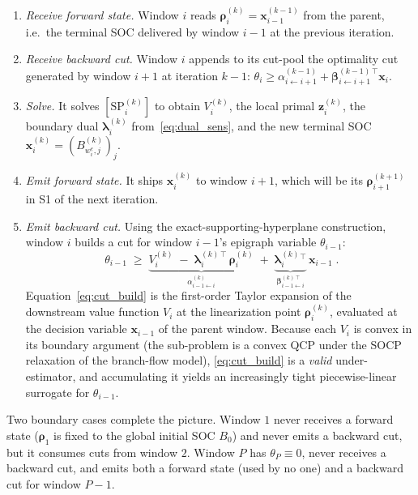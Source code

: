 \begin{enumerate}\itemsep2pt
\item[\textbf{S1.}]
\emph{Receive forward state.} Window $i$ reads
$\bm{\rho}_i^{(k)} = \bm{x}_{i-1}^{(k-1)}$ from the parent, i.e.\ the
terminal SOC delivered by window $i{-}1$ at the previous iteration.

\item[\textbf{S2.}]
\emph{Receive backward cut.} Window $i$ appends to its cut-pool the
optimality cut generated by window $i{+}1$ at iteration $k{-}1$:
\(
\theta_i \ge
\alpha_{i\leftarrow i{+}1}^{(k-1)} +
\bm{\beta}_{i\leftarrow i{+}1}^{(k-1)\,\top}\bm{x}_i.
\)

\item[\textbf{S3.}]
\emph{Solve.} It solves
$[\mathrm{SP}_i^{(k)}]$ to obtain $V_i^{(k)}$, the local primal
$\bm{z}_i^{(k)}$, the boundary dual
$\bm{\lambda}_i^{(k)}$ from~\eqref{eq:dual_sens}, and the new
terminal SOC $\bm{x}_i^{(k)} = (B_{w^{e}_i,j}^{(k)})_j$.

\item[\textbf{S4.}]
\emph{Emit forward state.} It ships $\bm{x}_i^{(k)}$ to window $i{+}1$,
which will be its $\bm{\rho}_{i+1}^{(k+1)}$ in S1 of the next iteration.

\item[\textbf{S5.}]
\emph{Emit backward cut.} Using the exact-supporting-hyperplane
construction, window $i$ builds a cut for window $i{-}1$'s epigraph
variable $\theta_{i-1}$:
\begin{equation}
\label{eq:cut_build}
\boxed{\;
\theta_{i-1} \;\ge\;
\underbrace{V_i^{(k)} \;-\; \bm{\lambda}_i^{(k)\,\top}\,\bm{\rho}_i^{(k)}}_{\displaystyle \alpha_{i-1\leftarrow i}^{(k)}}
\;+\;
\underbrace{\bm{\lambda}_i^{(k)}{}^{\top}}_{\displaystyle \bm{\beta}_{i-1\leftarrow i}^{(k)\,\top}}\,
\bm{x}_{i-1}\;.}
\end{equation}
Equation~\eqref{eq:cut_build} is the first-order Taylor expansion of the
downstream value function $V_i$ at the linearization point
$\bm{\rho}_i^{(k)}$, evaluated at the decision variable
$\bm{x}_{i-1}$ of the parent window. Because each $V_i$ is convex in
its boundary argument (the sub-problem is a convex QCP under the
SOCP relaxation of the branch-flow model), \eqref{eq:cut_build} is a
\emph{valid} under-estimator, and accumulating it yields an
increasingly tight piecewise-linear surrogate for $\theta_{i-1}$.
\end{enumerate}

Two boundary cases complete the picture. Window $1$ never receives a
forward state ($\bm{\rho}_1$ is fixed to the global initial SOC
$B_0$) and never emits a backward cut, but it consumes cuts from
window $2$. Window $P$ has $\theta_P\!\equiv\!0$, never receives a
backward cut, and emits both a forward state (used by no one) and a
backward cut for window $P{-}1$.

